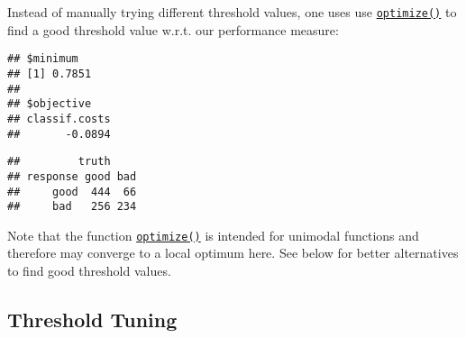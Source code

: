 \documentclass[
]{scrbook}
\newenvironment{Shaded}{\begin{snugshade}}{\end{snugshade}}
\newcommand{\CommentTok}[1]{\textcolor[rgb]{0.56,0.35,0.01}{\textit{#1}}}
\newcommand{\ControlFlowTok}[1]{\textcolor[rgb]{0.13,0.29,0.53}{\textbf{#1}}}
\newcommand{\DecValTok}[1]{\textcolor[rgb]{0.00,0.00,0.81}{#1}}
\newcommand{\FloatTok}[1]{\textcolor[rgb]{0.00,0.00,0.81}{#1}}
\newcommand{\FunctionTok}[1]{\textcolor[rgb]{0.00,0.00,0.00}{#1}}
\newcommand{\NormalTok}[1]{#1}
\newcommand{\OtherTok}[1]{\textcolor[rgb]{0.56,0.35,0.01}{#1}}
\newcommand{\SpecialCharTok}[1]{\textcolor[rgb]{0.00,0.00,0.00}{#1}}
\renewenvironment{Shaded} {\begin{snugshade}\small} {\end{snugshade}}
\begin{document}
Instead of manually trying different threshold values, one uses use \href{https://www.rdocumentation.org/packages/stats/topics/optimize}{\texttt{optimize()}} to find a good threshold value w.r.t. our performance measure:

\begin{Shaded}
\end{Shaded}

\begin{verbatim}
## $minimum
## [1] 0.7851
## 
## $objective
## classif.costs 
##       -0.0894
\end{verbatim}

\begin{Shaded}
\end{Shaded}

\begin{verbatim}
##         truth
## response good bad
##     good  444  66
##     bad   256 234
\end{verbatim}

Note that the function \href{https://www.rdocumentation.org/packages/stats/topics/optimize}{\texttt{optimize()}} is intended for unimodal functions and therefore may converge to a local optimum here.
See below for better alternatives to find good threshold values.

\hypertarget{threshold-tuning}{%
\subsection{Threshold Tuning}\label{threshold-tuning}}
\end{document}

